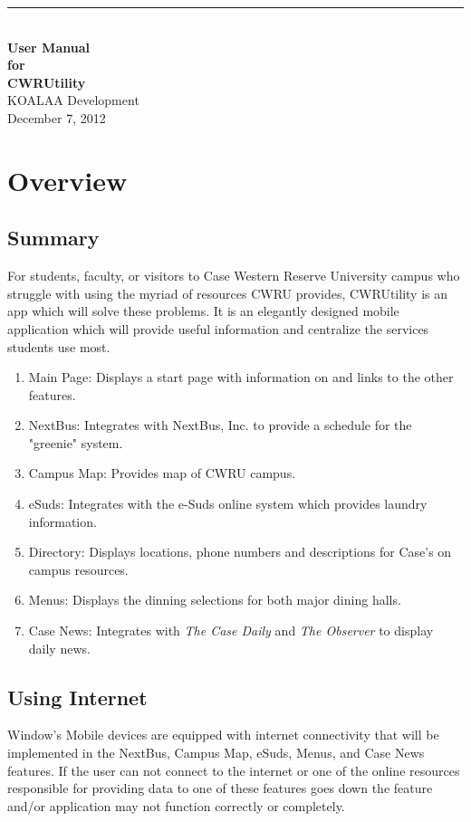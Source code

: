 \documentclass[pdftex,12pt,letter]{article}
\newcommand{\HRule}{\rule{\linewidth}{0.5mm}}
\begin{document}
\begin{titlepage}
\begin{flushright}
\HRule \\[0.4cm]
{ \bfseries
{\huge  User Manual\\[1cm]}
{\Large for\\[1cm]}
{\huge CWRUtility\large}\\[4cm]}
{\large KOALAA Development\\[1cm]December 7, 2012}
\end{flushright}
\end{titlepage}
\tableofcontents{}

\newpage
\section{Overview}
\subsection{Summary}
For students, faculty, or visitors to Case Western Reserve University campus who struggle with using the myriad of resources CWRU provides, CWRUtility is an app which will solve these problems. It is an elegantly designed mobile application which will provide useful information and centralize the services students use most.
\begin{enumerate}[FE-1:]
\item Main Page: Displays a start page with information on and links to the other features.
\item NextBus: Integrates with NextBus, Inc. to provide a schedule for the "greenie" system.
\item Campus Map: Provides map of CWRU campus.
\item eSuds: Integrates with the e-Suds online system which provides laundry information.
\item Directory: Displays locations, phone numbers and descriptions for Case's on campus resources.
\item Menus: Displays the dinning selections for both major dining halls.
\item Case News: Integrates with \emph{The Case Daily} and \emph{The Observer} to display daily news.
\end{enumerate} 
\subsection{Using Internet}
Window's Mobile devices are equipped with  internet connectivity that will be implemented in the NextBus, Campus Map, eSuds, Menus, and Case News features. If the user can not connect to the internet or one of the online resources responsible for providing data to one of these features goes down the feature and/or application may not function correctly or completely. 
\end{document}
